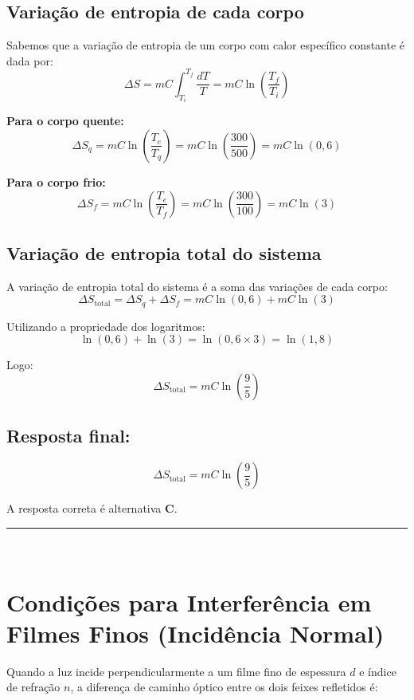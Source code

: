 \documentclass[a4paper,12pt]{article}
\begin{document}
\begin{flushleft}
\subsection*{Variação de entropia de cada corpo}

Sabemos que a variação de entropia de um corpo com calor específico constante é dada por:
\[
\Delta S = mC \int_{T_i}^{T_f} \frac{dT}{T} = mC \ln\left( \frac{T_f}{T_i} \right)
\]

\textbf{Para o corpo quente:}
\[
\Delta S_q =
mC \ln\left( \frac{T_e}{T_q} \right) =
mC \ln\left( \frac{300}{500} \right) =
mC \ln(0{,}6)
\]

\textbf{Para o corpo frio:}
\[
\Delta S_f =
mC \ln\left( \frac{T_e}{T_f} \right) =
mC \ln\left( \frac{300}{100} \right) =
mC \ln(3)
\]

\subsection*{Variação de entropia total do sistema}

A variação de entropia total do sistema é a soma das variações de cada corpo:
\[
\Delta S_\text{total} =
\Delta S_q + \Delta S_f =
mC \ln(0{,}6) + mC \ln(3)
\]

Utilizando a propriedade dos logaritmos:
\[
\ln(0{,}6) + \ln(3) = \ln(0{,}6 \times 3) = \ln(1{,}8)
\]

Logo:
\[
\Delta S_\text{total} =
mC \ln(\frac{9}{5})
\]

\subsection*{Resposta final:}
\[
\boxed{
\Delta S_\text{total} =
mC \ln(\frac{9}{5})
}
\]



A resposta correta é alternativa \colorbox{green!50}{\textbf{C}}.
\end{flushleft}

\noindent\rule{\linewidth}{0.6pt}\\

\section*{Condições para Interferência em Filmes Finos (Incidência Normal)}

Quando a luz incide perpendicularmente a um filme fino de espessura \( d \) e índice de refração \( n \), a diferença 
de caminho óptico entre os dois feixes refletidos é:
\end{document}
